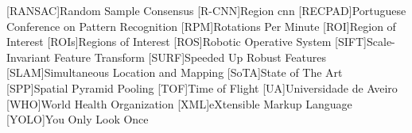 \begin{multicols}{2}
\begin{acronym}[AAAAAA]
	[RANSAC]{Random Sample Consensus}
	[R-CNN]{Region \acl{cnn}}
	[RECPAD]{Portuguese Conference on Pattern Recognition}
	[RPM]{Rotations Per Minute}
	[ROI]{Region of Interest}
	[ROIs]{Regions of Interest}
	[ROS]{Robotic Operative System}
	[SIFT]{Scale-Invariant Feature Transform}
	[SURF]{Speeded Up Robust Features}
	[SLAM]{Simultaneous Location and Mapping} 
	[SoTA]{State of The Art}
	[SPP]{Spatial Pyramid Pooling}
	[TOF]{Time of Flight} 
	[UA]{Universidade de Aveiro}
	[WHO]{World Health Organization}
	[XML]{eXtensible Markup Language}
	[YOLO]{You Only Look Once}
\end{acronym}
\end{multicols}

